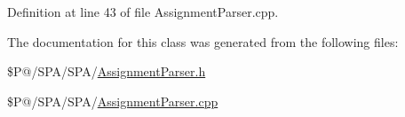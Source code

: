 Definition at line 43 of file Assignment\-Parser.\-cpp.



The documentation for this class was generated from the following files\-:\begin{DoxyCompactItemize}
\item 
\$\-P@/\-S\-P\-A/\-S\-P\-A/\hyperlink{_assignment_parser_8h}{Assignment\-Parser.\-h}\item 
\$\-P@/\-S\-P\-A/\-S\-P\-A/\hyperlink{_assignment_parser_8cpp}{Assignment\-Parser.\-cpp}\end{DoxyCompactItemize}
